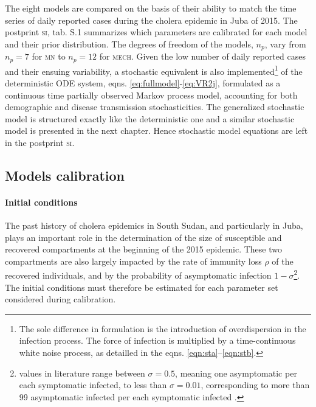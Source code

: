  The eight models are compared on the basis of their ability to match the time series of daily reported cases during the cholera epidemic in Juba of 2015. The postprint \textsc{si}, tab. S.1 summarizes which parameters are calibrated for each model and their prior distribution. The degrees of freedom of the models, $n_p$, vary from $n_p=7$ for \textsc{mn} to $n_p=12$ for \textsc{mech}. Given the low number of daily reported cases and their ensuing variability, a stochastic equivalent is also implemented\footnote[][-8\baselineskip]{The sole difference in formulation is the introduction of overdispersion in the infection process. The force of infection is multiplied by a time-continuous white noise process, as detailled in the eqns. \eqref{eqn:sta}--\eqref{eqn:stb}.} of the deterministic ODE system, eqns. \eqref{eq:fullmodel}-\eqref{eq:VR2j}, formulated as a continuous time partially observed Markov process model, accounting for both demographic and disease transmission stochasticities\cite{Breto:TimeSeriesAnalysis:2009}. The generalized stochastic model is structured exactly like the deterministic one and a similar stochastic model is presented in the next chapter. Hence stochastic model equations are left in the postprint \textsc{si}.%

\subsection{Models calibration}
\paragraph{Initial conditions} The past history of cholera epidemics in South Sudan, and particularly in Juba, plays an important role in the determination of the size of susceptible and recovered compartments at the beginning of the 2015 epidemic. These two compartments are also largely impacted by the rate of immunity loss $\rho$ of the recovered individuals, and by the probability of asymptomatic infection $1-\sigma$\footnote[][2\baselineskip]{values in literature range between $\sigma=0.5$, meaning one asymptomatic per each symptomatic infected, to less than $\sigma=0.01$, corresponding to more than 99 asymptomatic infected per each symptomatic infected \parencite{Fung:CholeraTransmissionDynamic:2014}.}. The initial conditions must therefore be estimated for each parameter set considered during calibration.

